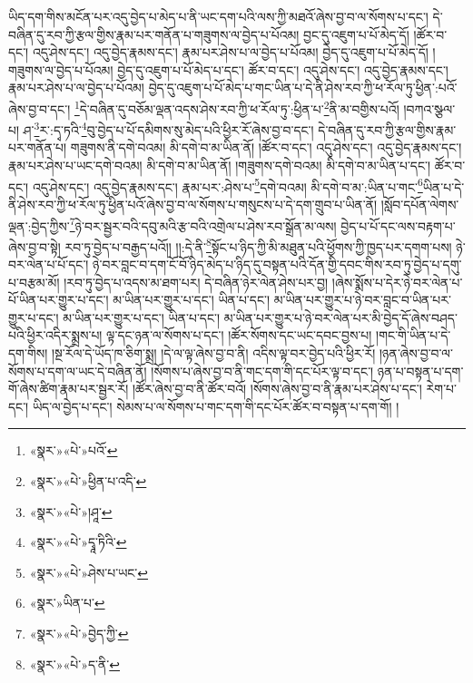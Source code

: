 ཡིད་དག་གིས་མངོན་པར་འདུ་བྱེད་པ་མེད་པ་ནི་ཡང་དག་པའི་ལས་ཀྱི་མཐའོ་ཞེས་བྱ་བ་ལ་སོགས་པ་དང་། དེ་བཞིན་དུ་རབ་ཀྱི་རྩལ་གྱིས་རྣམ་པར་གནོན་པ་གཟུགས་ལ་བྱེད་པ་པོའམ། བྱང་དུ་འཇུག་པ་པོ་མེད་དོ། །ཚོར་བ་དང་། འདུ་ཤེས་དང་། འདུ་བྱེད་རྣམས་དང་། རྣམ་པར་ཤེས་པ་ལ་བྱེད་པ་པོའམ། བྱེད་དུ་འཇུག་པ་པོ་མེད་དོ། །གཟུགས་ལ་བྱེད་པ་པོའམ། བྱེད་དུ་འཇུག་པ་པོ་མེད་པ་དང་། ཚོར་བ་དང་། འདུ་ཤེས་དང་། འདུ་བྱེད་རྣམས་དང་། རྣམ་པར་ཤེས་པ་ལ་བྱེད་པ་པོའམ། བྱེད་དུ་འཇུག་པ་པོ་མེད་པ་གང་ཡིན་པ་དེ་ནི་ཤེས་རབ་ཀྱི་ཕ་རོལ་ཏུ་ཕྱིན་:པའོ་ཞེས་བྱ་བ་དང་། \footnote{«སྣར་»«པེ་»པའོ་}དེ་བཞིན་དུ་བཅོམ་ལྡན་འདས་ཤེས་རབ་ཀྱི་ཕ་རོལ་ཏུ་:ཕྱིན་པ་\footnote{«སྣར་»«པེ་»ཕྱིན་པ་འདི་}ནི་མ་བགྱིས་པའོ། །བཀའ་སྩལ་པ། ཤ་\footnote{«སྣར་»«པེ་»།ཤཱ་}ར་:དྭ་ཏའི་\footnote{«སྣར་»«པེ་»དྭཱ་ཏིའི་}བུ་བྱེད་པ་པོ་དམིགས་སུ་མེད་པའི་ཕྱིར་རོ་ཞེས་བྱ་བ་དང་། དེ་བཞིན་དུ་རབ་ཀྱི་རྩལ་གྱིས་རྣམ་པར་གནོན་པ། གཟུགས་ནི་དགེ་བའམ། མི་དགེ་བ་མ་ཡིན་ནོ། །ཚོར་བ་དང་། འདུ་ཤེས་དང་། འདུ་བྱེད་རྣམས་དང་། རྣམ་པར་ཤེས་པ་ཡང་དགེ་བའམ། མི་དགེ་བ་མ་ཡིན་ནོ། །གཟུགས་དགེ་བའམ། མི་དགེ་བ་མ་ཡིན་པ་དང་། ཚོར་བ་དང་། འདུ་ཤེས་དང་། འདུ་བྱེད་རྣམས་དང་། རྣམ་པར་:ཤེས་པ་\footnote{«སྣར་»«པེ་»ཤེས་པ་ཡང་}དགེ་བའམ། མི་དགེ་བ་མ་:ཡིན་པ་གང་\footnote{«སྣར་»ཡིན་པ་}ཡིན་པ་དེ་ནི་ཤེས་རབ་ཀྱི་ཕ་རོལ་ཏུ་ཕྱིན་པའོ་ཞེས་བྱ་བ་ལ་སོགས་པ་གསུངས་པ་དེ་དག་གྲུབ་པ་ཡིན་ནོ། །སློབ་དཔོན་ལེགས་ལྡན་:བྱེད་ཀྱིས་\footnote{«སྣར་»«པེ་»བྱེད་ཀྱི་}ཉེ་བར་སྦྱར་བའི་དབུ་མའི་རྩ་བའི་འགྲེལ་པ་ཤེས་རབ་སྒྲོན་མ་ལས། བྱེད་པ་པོ་དང་ལས་བརྟག་པ་ཞེས་བྱ་བ་སྟེ། རབ་ཏུ་བྱེད་པ་བརྒྱད་པའོ།། །།:དེ་ནི་\footnote{«སྣར་»«པེ་»ད་ནི་}སྟོང་པ་ཉིད་ཀྱི་མི་མཐུན་པའི་ཕྱོགས་ཀྱི་ཁྱད་པར་དགག་པས། ཉེ་བར་ལེན་པ་པོ་དང་། ཉེ་བར་བླང་བ་དག་ངོ་བོ་ཉིད་མེད་པ་ཉིད་དུ་བསྟན་པའི་དོན་གྱི་དབང་གིས་རབ་ཏུ་བྱེད་པ་དགུ་པ་བརྩམ་མོ། །རབ་ཏུ་བྱེད་པ་འདས་མ་ཐག་པར། དེ་བཞིན་ཉེར་ལེན་ཤེས་པར་བྱ། །ཞེས་སྨོས་པ་དེར་ཉེ་བར་ལེན་པ་པོ་ཡིན་པར་གྱུར་པ་དང་། མ་ཡིན་པར་གྱུར་པ་དང་། ཡིན་པ་དང་། མ་ཡིན་པར་གྱུར་པ་ཉེ་བར་བླང་བ་ཡིན་པར་གྱུར་པ་དང་། མ་ཡིན་པར་གྱུར་པ་དང་། ཡིན་པ་དང་། མ་ཡིན་པར་གྱུར་པ་ཉེ་བར་ལེན་པར་མི་བྱེད་དོ་ཞེས་བཤད་པའི་ཕྱིར་འདིར་སྨྲས་པ། ལྟ་དང་ཉན་ལ་སོགས་པ་དང་། །ཚོར་སོགས་དང་ཡང་དབང་བྱས་པ། །གང་གི་ཡིན་པ་དེ་དག་གིས། །སྔ་རོལ་དེ་ཡོད་ཁ་ཅིག་སྨྲ། །དེ་ལ་ལྟ་ཞེས་བྱ་བ་ནི། འདིས་ལྟ་བར་བྱེད་པའི་ཕྱིར་རོ། །ཉན་ཞེས་བྱ་བ་ལ་སོགས་པ་དག་ལ་ཡང་དེ་བཞིན་ནོ། །སོགས་པ་ཞེས་བྱ་བ་ནི་གང་དག་གི་དང་པོར་ལྟ་བ་དང་། ཉན་པ་བསྟན་པ་དག་གོ་ཞེས་ཚིག་རྣམ་པར་སྦྱར་རོ། །ཚོར་ཞེས་བྱ་བ་ནི་ཚོར་བའོ། །སོགས་ཞེས་བྱ་བ་ནི་རྣམ་པར་ཤེས་པ་དང་། རེག་པ་དང་། ཡིད་ལ་བྱེད་པ་དང་། སེམས་པ་ལ་སོགས་པ་གང་དག་གི་དང་པོར་ཚོར་བ་བསྟན་པ་དག་གོ། །
